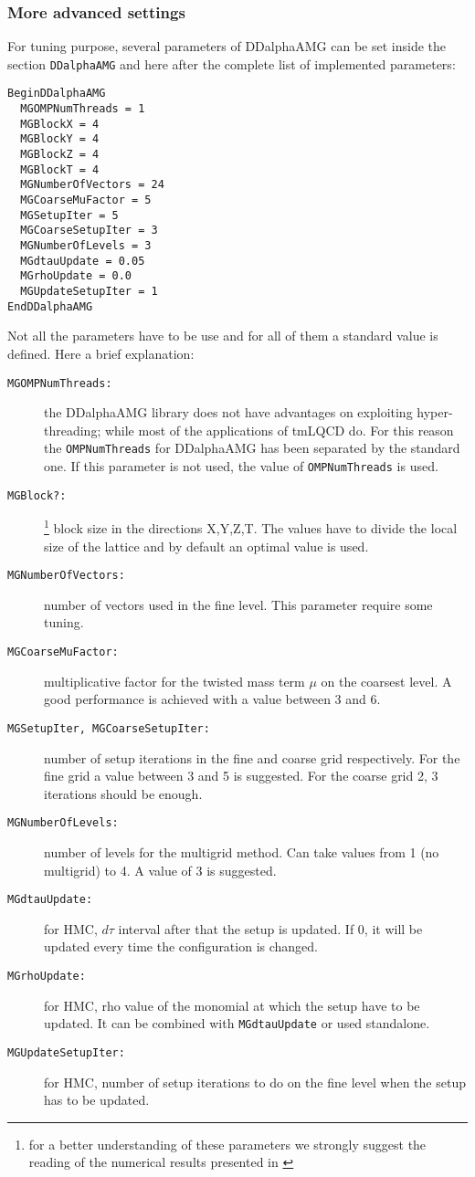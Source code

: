 \subsubsection{More advanced settings}
For tuning purpose, several parameters of DDalphaAMG can be set inside the section \texttt{DDalphaAMG} and here after the complete list of implemented parameters: 
\begin{Verbatim}[fontsize=\small]
BeginDDalphaAMG
  MGOMPNumThreads = 1
  MGBlockX = 4
  MGBlockY = 4
  MGBlockZ = 4
  MGBlockT = 4
  MGNumberOfVectors = 24
  MGCoarseMuFactor = 5
  MGSetupIter = 5
  MGCoarseSetupIter = 3
  MGNumberOfLevels = 3
  MGdtauUpdate = 0.05
  MGrhoUpdate = 0.0
  MGUpdateSetupIter = 1
EndDDalphaAMG
\end{Verbatim}
Not all the parameters have to be use and for all of them a standard value is defined. Here a brief explanation:
\begin{description}
	\item[\texttt{MGOMPNumThreads:}] the DDalphaAMG library does not have advantages on exploiting hyper-threading; while most of the applications of tmLQCD do. For this reason the \texttt{OMPNumThreads} for DDalphaAMG has been separated by the standard one. If this parameter is not used, the value of \texttt{OMPNumThreads} is used.
	\item[\texttt{MGBlock?:}]\footnote{\label{fn:Alexandrou:2016} for a better understanding of these parameters we strongly suggest the reading of the numerical results presented in \cite{Alexandrou:2016}} block size in the directions X,Y,Z,T. The values have to divide the local size of the lattice and by default an optimal value is used.
	\item[\texttt{MGNumberOfVectors:}] number of vectors used in the fine level. This parameter require some tuning.
	\item[\texttt{MGCoarseMuFactor:}] multiplicative factor for the twisted mass term $\mu$ on the coarsest level. A good performance is achieved with a value between 3 and 6.
	\item[\texttt{MGSetupIter, MGCoarseSetupIter:}] number of setup iterations in the fine and coarse grid respectively. For the fine grid a value between 3 and 5 is suggested. For the coarse grid 2, 3 iterations should be enough. 
	\item[\texttt{MGNumberOfLevels:}] number of levels for the multigrid method. Can take values from 1 (no multigrid) to 4. A value of 3 is suggested.
	\item[\texttt{MGdtauUpdate:}] for HMC, $d\tau$ interval after that the setup is updated. If 0, it will be updated every time the configuration is changed.
	\item[\texttt{MGrhoUpdate:}] for HMC, rho value of the monomial at which the setup have to be updated. It can be combined with \texttt{MGdtauUpdate} or used standalone.
	\item[\texttt{MGUpdateSetupIter:}] for HMC, number of setup iterations to do on the fine level when the setup has to be updated.
\end{description}
